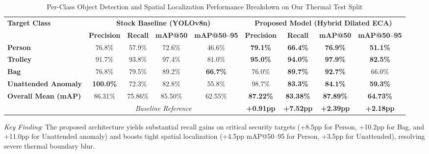 \documentclass[journal,twoside,web]{ieeecolor}
\begin{document}
\begin{table}[t]
\centering
\caption{Per-Class Object Detection and Spatial Localization Performance Breakdown on Our Thermal Test Split}
\label{tab:per_class_breakdown}
\small
\renewcommand{\arraystretch}{1.22}
\setlength{\tabcolsep}{7pt}
\begin{tabular}{l cccc cccc}
\toprule
\multirow{2}{*}{\textbf{Target Class}} & 
\multicolumn{4}{c}{\textbf{Stock Baseline (YOLOv8n)}} & 
\multicolumn{4}{c}{\textbf{Proposed Model (Hybrid Dilated ECA)}} \\
\cmidrule(lr){2-5} \cmidrule(lr){6-9}
& \textbf{Precision} & \textbf{Recall} & \textbf{mAP@50} & \textbf{mAP@50--95} 
& \textbf{Precision} & \textbf{Recall} & \textbf{mAP@50} & \textbf{mAP@50--95} \\
\midrule
\textbf{Person}             & 76.8\% & 57.9\% & 72.6\% & 46.6\% & \textbf{79.1\%} & \textbf{66.4\%} & \textbf{76.9\%} & \textbf{51.1\%} \\
\textbf{Trolley}            & 91.7\% & 93.8\% & 97.4\% & 81.0\% & \textbf{95.0\%} & \textbf{94.0\%} & \textbf{97.9\%} & \textbf{82.5\%} \\
\textbf{Bag}                & 76.8\% & 79.5\% & 89.2\% & \textbf{66.7\%} & 76.0\% & \textbf{89.7\%} & \textbf{92.7\%} & 66.0\% \\
\textbf{Unattended Anomaly} & \textbf{100.0\%} & 72.3\% & 82.8\% & 55.8\% & 98.7\% & \textbf{83.3\%} & \textbf{84.1\%} & \textbf{59.3\%} \\
\midrule
\rowcolor{gray!12}
\textbf{Overall Mean (mAP)} & 86.31\% & 75.86\% & 85.50\% & 62.55\% & \textbf{87.22\%} & \textbf{83.38\%} & \textbf{87.89\%} & \textbf{64.73\%} \\
\rowcolor{gray!06}
\multicolumn{1}{l}{\textit{Improvement ($\Delta$)}} & \multicolumn{4}{c}{\textit{Baseline Reference}} & \textbf{+0.91pp} & \textbf{+7.52pp} & \textbf{+2.39pp} & \textbf{+2.18pp} \\
\bottomrule
\end{tabular}
\vspace{1ex}
{\raggedright \footnotesize \textit{Key Finding}: The proposed architecture yields substantial recall gains on critical security targets (+8.5pp for Person, +10.2pp for Bag, and +11.0pp for Unattended anomaly) and boosts tight spatial localization (+4.5pp mAP@50--95 for Person, +3.5pp for Unattended), resolving severe thermal boundary blur.\par}
\end{table}
\end{document}
